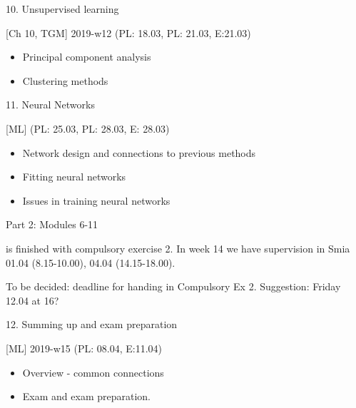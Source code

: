 \documentclass[10pt,ignorenonframetext,]{beamer}
\providecommand{\tightlist}{%
  \setlength{\itemsep}{0pt}\setlength{\parskip}{0pt}}
\begin{document}
\begin{frame}

\begin{block}{10. Unsupervised learning}

{[}Ch 10, TGM{]} 2019-w12 (PL: 18.03, PL: 21.03, E:21.03)

\begin{itemize}
\tightlist
\item
  Principal component analysis
\item
  Clustering methods
\end{itemize}

\end{block}

\begin{block}{11. Neural Networks}

{[}ML{]} (PL: 25.03, PL: 28.03, E: 28.03)

\begin{itemize}
\tightlist
\item
  Network design and connections to previous methods
\item
  Fitting neural networks
\item
  Issues in training neural networks
\end{itemize}

\end{block}

\end{frame}

\begin{frame}

\begin{block}{Part 2: Modules 6-11}

is finished with compulsory exercise 2. In week 14 we have supervision
in Smia 01.04 (8.15-10.00), 04.04 (14.15-18.00).

To be decided: deadline for handing in Compulsory Ex 2. Suggestion:
Friday 12.04 at 16?

\end{block}

\begin{block}{12. Summing up and exam preparation}

{[}ML{]} 2019-w15 (PL: 08.04, E:11.04)

\begin{itemize}
\tightlist
\item
  Overview - common connections
\item
  Exam and exam preparation.
\end{itemize}

\end{block}

\end{frame}
\end{document}
